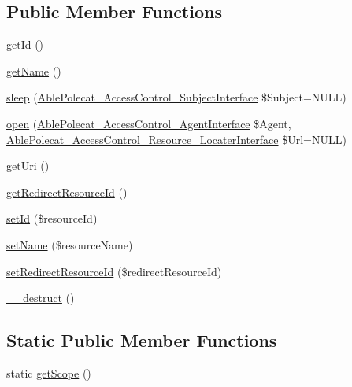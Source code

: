 \subsection*{Public Member Functions}
\begin{DoxyCompactItemize}
\item 
\hyperlink{class_able_polecat___resource_abstract_a12251d0c022e9e21c137a105ff683f13}{get\+Id} ()
\item 
\hyperlink{class_able_polecat___resource_abstract_a3d0963e68bb313b163a73f2803c64600}{get\+Name} ()
\item 
\hyperlink{class_able_polecat___resource_abstract_a365e24d7b066205cafa2a5cce3a4f224}{sleep} (\hyperlink{interface_able_polecat___access_control___subject_interface}{Able\+Polecat\+\_\+\+Access\+Control\+\_\+\+Subject\+Interface} \$Subject=N\+U\+L\+L)
\item 
\hyperlink{class_able_polecat___resource_abstract_aaba20e74dced7f11f018a5a86ead176e}{open} (\hyperlink{interface_able_polecat___access_control___agent_interface}{Able\+Polecat\+\_\+\+Access\+Control\+\_\+\+Agent\+Interface} \$Agent, \hyperlink{interface_able_polecat___access_control___resource___locater_interface}{Able\+Polecat\+\_\+\+Access\+Control\+\_\+\+Resource\+\_\+\+Locater\+Interface} \$Url=N\+U\+L\+L)
\item 
\hyperlink{class_able_polecat___resource_abstract_a2ac86cae38fbe15a019d075d485ab702}{get\+Uri} ()
\item 
\hyperlink{class_able_polecat___resource_abstract_abd12d28cbfdd5a45fba85bbac51a0b12}{get\+Redirect\+Resource\+Id} ()
\item 
\hyperlink{class_able_polecat___resource_abstract_aea086c97a20cf305b4a73485fd11763b}{set\+Id} (\$resource\+Id)
\item 
\hyperlink{class_able_polecat___resource_abstract_a396944828c457deecbba6acb9bee6abf}{set\+Name} (\$resource\+Name)
\item 
\hyperlink{class_able_polecat___resource_abstract_a1e0f2eaa0b2087d67e47c9f9ab72eaab}{set\+Redirect\+Resource\+Id} (\$redirect\+Resource\+Id)
\item 
\hyperlink{class_able_polecat___resource_abstract_a421831a265621325e1fdd19aace0c758}{\+\_\+\+\_\+destruct} ()
\end{DoxyCompactItemize}
\subsection*{Static Public Member Functions}
\begin{DoxyCompactItemize}
\item 
static \hyperlink{class_able_polecat___resource_abstract_ad9ade868bd136d32967059d1cccb3e92}{get\+Scope} ()
\end{DoxyCompactItemize}
